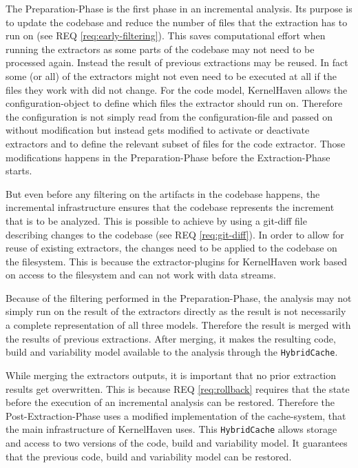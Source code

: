 \documentclass[a4paper]{article}
\begin{document}
The Preparation-Phase is the first phase in an incremental analysis. Its purpose is to update the codebase and reduce the number of files that the extraction has to run on (see REQ \ref{req:early-filtering}). This saves computational effort when running the extractors as some parts of the codebase  may not need to be processed again. Instead the result of previous extractions may be reused. In fact some (or all) of the extractors might not even need to be executed at all if the files they work with did not change. For the code model, KernelHaven allows the configuration-object to define which files the extractor should run on. 
 Therefore the configuration is not simply read from the configuration-file and passed on without modification but instead gets modified to activate or deactivate extractors and to define the relevant subset of files for the code extractor. Those modifications happens in the Preparation-Phase before the Extraction-Phase starts.

 But even before any filtering on the artifacts in the codebase happens, the incremental infrastructure ensures that the codebase represents the increment that is to be analyzed. This is possible to achieve by using a git-diff file describing changes to the codebase (see REQ \ref{req:git-diff}). In order to allow for reuse of existing extractors, the changes need to be applied to the codebase on the filesystem. This is because the extractor-plugins for KernelHaven work based on access to the filesystem and can not work with data streams.

Because of the filtering performed in the Preparation-Phase, the analysis may not simply run on the result of the extractors directly as the result is not necessarily a complete representation of all three models. Therefore the result is merged with the results of previous extractions. After merging, it makes the resulting code, build and variability model available to the analysis through the \texttt{Hybrid\-Cache}.

While merging the extractors outputs, it is important that no prior extraction results get overwritten. This is because REQ \ref{req:rollback} requires that the state before the execution of an incremental analysis can be restored. Therefore the Post-Extraction-Phase uses a modified implementation of the cache-system, that the main infrastructure of KernelHaven uses. This \texttt{Hybrid\-Cache} allows storage and access to two versions of the code, build and variability model. It guarantees that the previous code, build and variability model can be restored.
\end{document}
